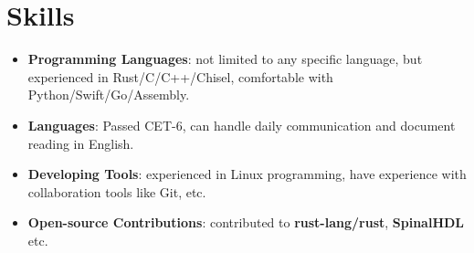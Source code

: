 \documentclass{resume}
\newcommand{\en}[1]{#1}
\newcommand{\zh}[1]{}
\begin{document}
\section{\en{Skills}\zh{技能}}
\begin{itemize}[parsep=0.25ex]
      \item \en{\textbf{Programming Languages}:
                  not limited to any specific language,
                  but experienced in Rust/C/C++/Chisel,
                  comfortable with Python/Swift/Go/Assembly.}
            \zh{\textbf{编程语言}:
                  不局限于特定编程语言，熟悉 Rust/C/C++/Chisel 等，
                  了解 Python/Swift/Go/Assembly 等。}

      \item \en{\textbf{Languages}:
                  Passed CET-6, can handle daily communication and document reading in English.
            }
            \zh{\textbf{语言}:
                  通过英语六级（525分），可以使用英语进行日常交流以及技术文档的阅读。
            }
      
      \item \en{\textbf{Developing Tools}:
                  experienced in Linux programming,
                  have experience with collaboration tools like Git, etc.}
            \zh{\textbf{开发工具}:
                  熟悉 Linux，有使用 Git 等协作工具的经验。}
            
      \item \en{\textbf{Open-source Contributions}:
                  contributed to \textbf{rust-lang/rust}, \textbf{SpinalHDL} etc.}
            \zh{\textbf{开源贡献}:
                  为 \textbf{rust-lang/rust}, \textbf{SpinalHDL} 等项目贡献过代码。}
\end{itemize}
\end{document}
